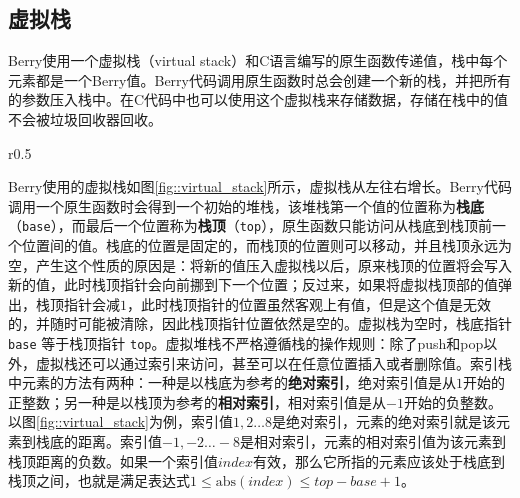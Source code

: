 \subsection{虚拟栈}

Berry使用一个虚拟栈（virtual stack）和C语言编写的原生函数传递值，栈中每个元素都是一个Berry值。Berry代码调用原生函数时总会创建一个新的栈，并把所有的参数压入栈中。在C代码中也可以使用这个虚拟栈来存储数据，存储在栈中的值不会被垃圾回收器回收。

\begin{wrapfigure}{r}{0.5\textwidth}
\centering
{}
\caption{虚拟栈}
\label{fig::virtual_stack}
\end{wrapfigure}

Berry使用的虚拟栈如图\ref{fig::virtual_stack}所示，虚拟栈从左往右增长。Berry代码调用一个原生函数时会得到一个初始的堆栈，该堆栈第一个值的位置称为\textbf{栈底}（\texttt{base}），而最后一个位置称为\textbf{栈顶}（\texttt{top}），原生函数只能访问从栈底到栈顶前一个位置间的值。栈底的位置是固定的，而栈顶的位置则可以移动，并且栈顶永远为空，产生这个性质的原因是：将新的值压入虚拟栈以后，原来栈顶的位置将会写入新的值，此时栈顶指针会向前挪到下一个位置；反过来，如果将虚拟栈顶部的值弹出，栈顶指针会减$1$，此时栈顶指针的位置虽然客观上有值，但是这个值是无效的，并随时可能被清除，因此栈顶指针位置依然是空的。虚拟栈为空时，栈底指针 \texttt{base} 等于栈顶指针 \texttt{top}。虚拟堆栈不严格遵循栈的操作规则：除了push和pop以外，虚拟栈还可以通过索引来访问，甚至可以在任意位置插入或者删除值。索引栈中元素的方法有两种：一种是以栈底为参考的\textbf{绝对索引}，绝对索引值是从$1$开始的正整数；另一种是以栈顶为参考的\textbf{相对索引}，相对索引值是从$-1$开始的负整数。以图\ref{fig::virtual_stack}为例，索引值$1,2\ldots 8$是绝对索引，元素的绝对索引就是该元素到栈底的距离。索引值$-1,-2\ldots -8$是相对索引，元素的相对索引值为该元素到栈顶距离的负数。如果一个索引值$index$有效，那么它所指的元素应该处于栈底到栈顶之间，也就是满足表达式$1\leqslant \mathrm{abs}(index)\leqslant top-base+1$。

